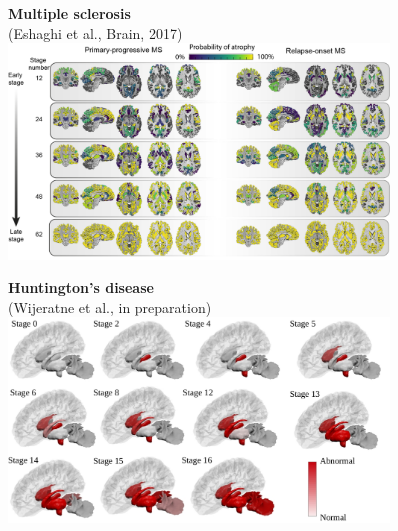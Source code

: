 \documentclass[8pt,xcolor=table]{beamer}
\begin{document}
\begin{frame}
\begin{small}
\begin{figure}[h]
    \begin{minipage}[t][\mnpHeight][t]{0.49\linewidth}
  \centering
    \textbf{Multiple sclerosis}\\ \footnotesize{(Eshaghi et al., Brain, 2017)}\\    
    \includegraphics[width=0.9\textwidth,trim=0 0 0 0,clip]{../ms_arman}
      \vspace{1em}
  \end{minipage}
  \begin{minipage}[t][\mnpHeight][t]{0.49\linewidth}
    \centering
    \textbf{Huntington's disease}\\ \footnotesize{(Wijeratne et al., in preparation)}
    \includegraphics[width=0.9\textwidth,trim=0 0 0 0, clip]{../hd_peter}
  \end{minipage}

\end{figure}
  \end{small}
  
  

\end{frame}
\end{document}
